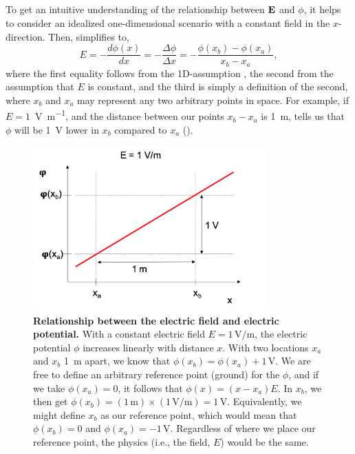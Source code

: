 \subsection{}
\label{sec:Basics:Ground}
To get an intuitive understanding of the relationship between ${\bf E}$ and $\phi$, it helps to consider an idealized one-dimensional scenario with a constant field in the $x$-direction. Then,  simplifies to,
\begin{equation}
E = -\frac{d\phi(x)}{dx} = -\frac{\Delta \phi}{\Delta x} = -\frac{\phi(x_b)-\phi(x_a)}{x_b-x_a},
\label{eq:Basics:EV1D}
\end{equation}
where the first equality follows from the 1D-assumption , the second from the assumption that $E$ is constant, and the third is simply a definition of the second, where $x_b$ and $x_a$ may represent any two arbitrary points in space. For example, if $E = 1$~\si{\volt\per\metre}, and the distance between our points $x_b-x_a$ is 1~\si{\metre},  tells us that $\phi$ will be 1~\si{\volt} lower in $x_b$ compared to $x_a$ ().

\begin{figure}[!ht]
\begin{center}
\includegraphics[width=0.8\textwidth]{Figures/Basics/Ground.png}
\end{center}
\caption{\textbf{Relationship between the electric field and electric potential.} With a constant electric field $E = 1\,\si{\volt\per\metre}$, the electric potential $\phi$ increases linearly with distance $x$. With two locations $x_a$ and $x_b$ 1~\si{\metre} apart, we know that $\phi(x_b) = \phi(x_a) + 1\,\si{\volt}$. We are free to define an arbitrary reference point (ground) for the $\phi$, and if we take $\phi(x_a) = 0$, it follows that $\phi(x) = (x-x_a)E$. In $x_b$, we then get $\phi(x_b)=(1\,\si{\metre})\times(1\, \si{\volt\per\metre}) =1\,\si{\volt}$. Equivalently, we might define $x_b$ as our reference point, which would mean that $\phi(x_b) = 0$ and $\phi(x_a) = -1\,\si{\volt}$. Regardless of where we place our reference point, the physics (i.e., the field, $E$) would be the same.
}
\label{fig:Basics:Ground}
\end{figure}

